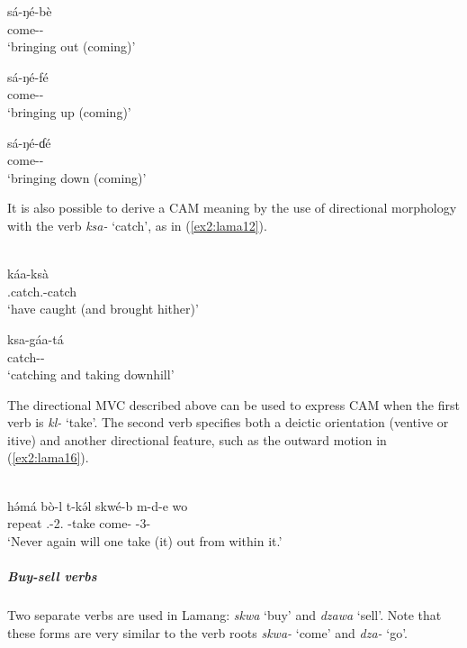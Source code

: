 \ex
\gll
sá-ŋé-bè \\
come-- \\
\glt `bringing out (coming)'

\ex
\gll
sá-ŋé-fé \\
come-- \\
\glt `bringing up (coming)'

\ex \label{ex2:lama20}
\gll
sá-ŋé-ɗé \\
come-- \\
\glt `bringing down (coming)'
\z 
\z 

It is also possible to derive a CAM meaning by the use of directional morphology with the verb \textit{ksa-} `catch', as in (\ref{ex2:lama12}).

\ea\label{ex2:lama12}
 \\

\ea
\gll
káa-ksà	\\
.catch.-catch	\\
\glt `have caught (and brought hither)'

\ex
\gll
ksa-gáa-tá	\\
catch--		\\
\glt `catching and taking downhill'
\z 
\z

\largerpage
The directional MVC described above can be used to express CAM when the first verb is \textit{kl-} ‘take’. The second verb specifies both a deictic orientation (ventive or itive) and another directional feature, such as the outward motion in (\ref{ex2:lama16}).

\ea\label{ex2:lama16}
 \\
\gll hə́má bò-l t-kə́l skwé-b m-d-e wo	\\
repeat .-2. -take come- -3-  \\
\glt `Never again will one take (it) out from within it.'
\z 

\subparagraph{Buy-sell verbs}

Two separate verbs are used in Lamang: \textit{skwa} ‘buy’ and \textit{dzawa} `sell'. Note that these forms are very similar to the verb roots \textit{skwa-} `come' and \textit{dza-} `go'. 

